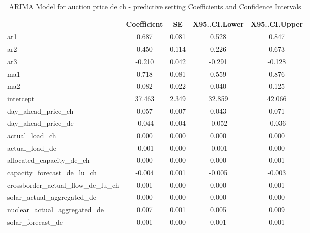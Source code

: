 \begin{table}
\caption{ARIMA Model for auction price de ch - predictive setting Coefficients and Confidence Intervals}
\centering
\begin{tabular}[t]{l|c|c|c|c}
\hline
  & Coefficient & SE & X95..CI.Lower & X95..CI.Upper\\
\hline
ar1 & 0.687 & 0.081 & 0.528 & 0.847\\
\hline
ar2 & 0.450 & 0.114 & 0.226 & 0.673\\
\hline
ar3 & -0.210 & 0.042 & -0.291 & -0.128\\
\hline
ma1 & 0.718 & 0.081 & 0.559 & 0.876\\
\hline
ma2 & 0.082 & 0.022 & 0.040 & 0.125\\
\hline
intercept & 37.463 & 2.349 & 32.859 & 42.066\\
\hline
day\_ahead\_price\_ch & 0.057 & 0.007 & 0.043 & 0.071\\
\hline
day\_ahead\_price\_de & -0.044 & 0.004 & -0.052 & -0.036\\
\hline
actual\_load\_ch & 0.000 & 0.000 & 0.000 & 0.000\\
\hline
actual\_load\_de & -0.001 & 0.000 & -0.001 & 0.000\\
\hline
allocated\_capacity\_de\_ch & 0.000 & 0.000 & 0.000 & 0.001\\
\hline
capacity\_forecast\_de\_lu\_ch & -0.004 & 0.001 & -0.005 & -0.003\\
\hline
crossborder\_actual\_flow\_de\_lu\_ch & 0.001 & 0.000 & 0.000 & 0.001\\
\hline
solar\_actual\_aggregated\_de & 0.000 & 0.000 & 0.000 & 0.000\\
\hline
nuclear\_actual\_aggregated\_de & 0.007 & 0.001 & 0.005 & 0.009\\
\hline
solar\_forecast\_de & 0.001 & 0.000 & 0.001 & 0.001\\
\hline
\end{tabular}
\end{table}\begin{table}


\end{table}

